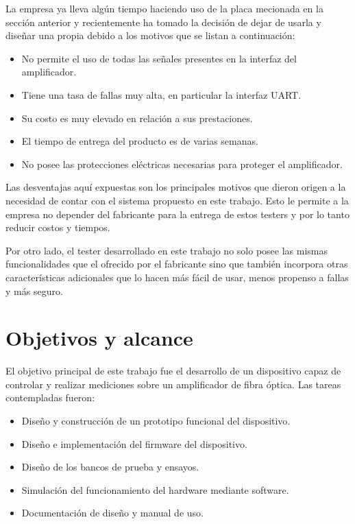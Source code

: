 La empresa ya lleva algún tiempo haciendo uso de la placa mecionada en la sección anterior y recientemente ha tomado la decisión de dejar de usarla y diseñar una propia debido a los motivos que se listan a continuación:

\begin{itemize}
\item No permite el uso de todas las señales presentes en la interfaz del amplificador.
\item Tiene una tasa de fallas muy alta, en particular la interfaz UART.
\item Su costo es muy elevado en relación a sus prestaciones.
\item El tiempo de entrega del producto es de varias semanas.
\item No posee las protecciones eléctricas necesarias para proteger el amplificador.
\end{itemize}

Las desventajas aquí expuestas son los principales motivos que dieron origen a la necesidad de contar con el sistema propuesto en este trabajo. Esto le permite a la empresa no depender del fabricante para la entrega de estos testers y por lo tanto reducir costos y tiempos.

Por otro lado, el tester desarrollado en este trabajo no solo posee las mismas funcionalidades que el ofrecido por el fabricante sino que también incorpora otras características adicionales que lo hacen más fácil de usar, menos propenso a fallas y más seguro.


\section{Objetivos y alcance}

El objetivo principal de este trabajo fue el desarrollo de un dispositivo capaz de controlar y realizar mediciones sobre un amplificador de fibra óptica. Las tareas contempladas fueron:

\begin{itemize}
\item Diseño y construcción de un prototipo funcional del dispositivo.
\item Diseño e implementación del firmware del dispositivo.
\item Diseño de los bancos de prueba y ensayos.
\item Simulación del funcionamiento del hardware mediante software.
\item Documentación de diseño y manual de uso.
\end{itemize}

